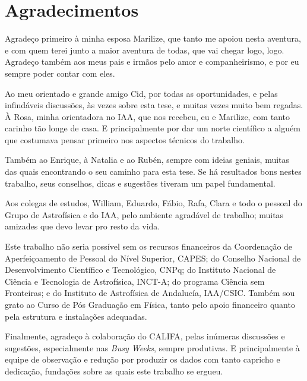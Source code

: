 


\chapter*{Agradecimentos}

Agradeço primeiro à minha esposa Marilize, que tanto me apoiou nesta aventura, e
com quem terei junto a maior aventura de todas, que vai chegar logo, logo. 
Agradeço também aos meus pais e irmãos pelo amor e companheirismo, e por eu
sempre poder contar com eles.

Ao meu orientado e grande amigo Cid, por todas as oportunidades, e pelas
infindáveis discussões, às vezes sobre esta tese, e muitas vezes muito bem
regadas. À Rosa, minha orientadora no IAA, que nos recebeu, eu e Marilize, com
tanto carinho tão longe de casa. E principalmente por dar um norte científico a
alguém que costumava pensar primeiro nos aspectos técnicos do trabalho.

Também ao Enrique, à Natalia e ao Rubén, sempre com ideias geniais, muitas das
quais encontrando o seu caminho para esta tese. Se há resultados bons nestes
trabalho, seus conselhos, dicas e sugestões tiveram um papel fundamental.

Aos colegas de estudos, William, Eduardo, Fábio, Rafa, Clara e todo o pessoal
do Grupo de Astrofísica e do IAA, pelo ambiente agradável de trabalho; muitas
amizades que devo levar pro resto da vida.

Este trabalho não seria possível sem os recursos financeiros da Coordenação de
Aperfeiçoamento de Pessoal do Nível Superior, CAPES; do Conselho Nacional de
Desenvolvimento Científico e Tecnológico, CNPq; do Instituto Nacional de Ciência
e Tecnologia de Astrofísica, INCT-A; do programa Ciência sem Fronteiras; e do
Instituto de Astrofísica de Andalucía, IAA/CSIC. Também sou grato ao Curso de
Pós Graduação em Física, tanto pelo apoio financeiro quanto pela estrutura e
instalações adequadas.

Finalmente, agradeço à colaboração do CALIFA, pelas inúmeras discussões e
sugestões, especialmente nas {\em Busy Weeks}, sempre produtivas. E
principalmente à equipe de observação e redução por produzir os dados com tanto
capricho e dedicação, fundações sobre as quais este trabalho se ergueu.


